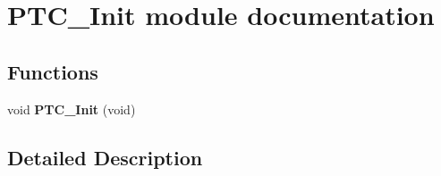 \hypertarget{group___p_t_c___init__module}{}\section{P\+T\+C\+\_\+\+Init module documentation}
\label{group___p_t_c___init__module}
\subsection*{Functions}
\begin{DoxyCompactItemize}
\item 
void {\bfseries P\+T\+C\+\_\+\+Init} (void)\hypertarget{group___p_t_c___init__module_ga555324ee9a5de626b5d9c676779db752}{}\label{group___p_t_c___init__module_ga555324ee9a5de626b5d9c676779db752}

\end{DoxyCompactItemize}


\subsection{Detailed Description}
